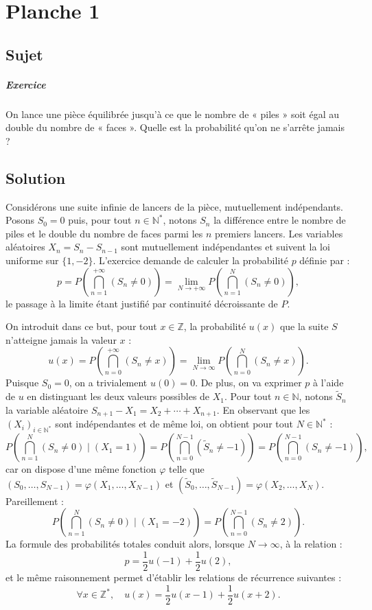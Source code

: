 \chapter{Planche 1}

\section{Sujet}

\paragraph{Exercice}

On lance une pièce équilibrée jusqu'à ce que le nombre de « piles » soit égal au double du nombre de « faces ». Quelle est la probabilité qu'on ne s'arrête jamais ?

\section{Solution}

Considérons une suite infinie de lancers de la pièce, mutuellement indépendants. Posons $S_0 = 0$ puis, pour tout $n \in \mathbb N^*$, notons $S_n$ la différence entre le nombre de piles et le double du nombre de faces parmi les $n$ premiers lancers. Les variables aléatoires $X_n = S_n - S_{n-1}$ sont mutuellement indépendantes et suivent la loi uniforme sur $\{1,-2\}$. L'exercice demande de calculer la probabilité $p$ définie par :
\[
p = P\left(\bigcap_{n=1}^{+\infty} (S_n \neq 0)\right) = \lim_{N\to+\infty} P\left(\bigcap_{n=1}^N (S_n \neq 0)\right),
\]
le passage à la limite étant justifié par continuité décroissante de $P$.

On introduit dans ce but, pour tout $x \in \mathbb Z$, la probabilité $u(x)$ que la suite $S$ n'atteigne jamais la valeur $x$ :
\[
u(x) = P\left(\bigcap_{n=0}^{+\infty} (S_n \neq x)\right) = \lim_{N\to\infty} P\left(\bigcap_{n=0}^N (S_n \neq x)\right).
\]
Puisque $S_0=0$, on a trivialement $u(0) = 0$. De plus, on va exprimer $p$ à l'aide de $u$ en distinguant les deux valeurs possibles de $X_1$. Pour tout $n \in \mathbb N$, notons $\tilde S_n$ la variable aléatoire $S_{n+1} - X_1 = X_2 + \cdots + X_{n+1}$. En observant que les $(X_i)_{i\in\mathbb N^*}$ sont indépendantes et de même loi, on obtient pour tout $N \in \mathbb N^*$ :
\[
P\left(\bigcap_{n=1}^N (S_n \neq 0)\mid (X_1 = 1)\right) = P\left(\bigcap_{n=0}^{N-1} (\tilde S_n \neq -1)\right) = P\left(\bigcap_{n=0}^{N-1} (S_n \neq -1)\right),
\]
car on dispose d'une même fonction $\varphi$ telle que $(S_0,\dots,S_{N-1}) = \varphi(X_1,\dots,X_{N-1})$ et $(\tilde S_0,\dots,\tilde S_{N-1}) = \varphi(X_2,\dots,X_N)$. 
Pareillement :
\[
P\left(\bigcap_{n=1}^N (S_n \neq 0)\mid (X_1 = -2)\right) = P\left(\bigcap_{n=0}^{N-1} (S_n \neq 2)\right).
\]
La formule des probabilités totales conduit alors, lorsque $N \to \infty$, à la relation :
\[
p= \frac12 u(-1) + \frac12 u(2),
\]
et le même raisonnement permet d'établir les relations de récurrence suivantes :
\[
\forall x \in \mathbb Z^*,\quad
u(x) = \frac12 u(x-1) + \frac12 u(x+2).
\]

